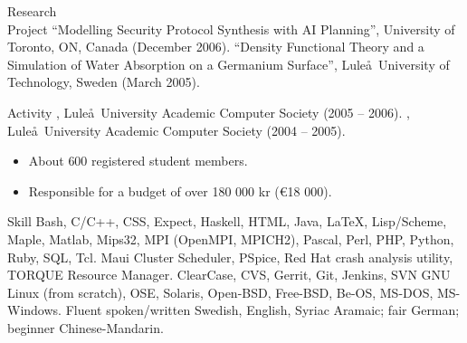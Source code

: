 \documentclass{../../cls/cv}
\begin{document}
\begin{category}{Research \\ Project}
\citembullet ``Modelling Security Protocol Synthesis with AI Planning'', University of Toronto, ON, Canada (December 2006).
\citembullet ``Density Functional Theory and a Simulation of Water Absorption on a Germanium Surface'', Lule\aa\ University of Technology, Sweden (March 2005).
\end{category}


\begin{category}{Activity}
, Lule\aa \ University Academic
Computer Society (2005 -- 2006).
, Lule\aa \ University Academic Computer Society
(2004 -- 2005).
\begin{itemize}
\item About $600$ registered student members.
\item Responsible for a budget of over 180 000 kr (\euro18 000).
\end{itemize}
\end{category}

\begin{category}{Skill}
\citembullet Bash, C/C++, CSS, Expect, Haskell, HTML, Java, \LaTeX, Lisp/Scheme, Maple, Matlab,
Mips32, MPI (OpenMPI, MPICH2), Pascal, Perl, PHP, Python, Ruby, SQL, Tcl.
\citembullet Maui Cluster Scheduler, PSpice, Red Hat crash analysis utility, TORQUE Resource Manager.
\citembullet ClearCase, CVS, Gerrit, Git, Jenkins, SVN
\citembullet GNU Linux (from scratch), OSE, Solaris, Open-BSD, Free-BSD, Be-OS, MS-DOS, MS-Windows.
\citembullet Fluent spoken/written Swedish, English, Syriac Aramaic;
fair German; \\ beginner Chinese-Mandarin.
\end{category}


\end{document}
